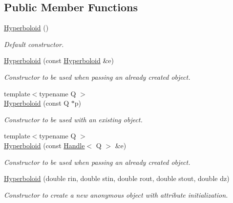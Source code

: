 \subsection*{Public Member Functions}
\begin{DoxyCompactItemize}
\item 
\hyperlink{class_d_d4hep_1_1_geometry_1_1_hyperboloid_afe9a3bdf73ffebe6f16ac8da3af563e7}{Hyperboloid} ()
\begin{DoxyCompactList}\small\item\em Default constructor. \item\end{DoxyCompactList}\item 
\hyperlink{class_d_d4hep_1_1_geometry_1_1_hyperboloid_a440775dc04e1e4b02254cce1867c7ee9}{Hyperboloid} (const \hyperlink{class_d_d4hep_1_1_geometry_1_1_hyperboloid}{Hyperboloid} \&e)
\begin{DoxyCompactList}\small\item\em Constructor to be used when passing an already created object. \item\end{DoxyCompactList}\item 
{\footnotesize template$<$typename Q $>$ }\\\hyperlink{class_d_d4hep_1_1_geometry_1_1_hyperboloid_ab4f5034fea85831e9fdda65dfcc717c7}{Hyperboloid} (const Q $\ast$p)
\begin{DoxyCompactList}\small\item\em Constructor to be used with an existing object. \item\end{DoxyCompactList}\item 
{\footnotesize template$<$typename Q $>$ }\\\hyperlink{class_d_d4hep_1_1_geometry_1_1_hyperboloid_a38aabbad56ee5c27ad2d67df74bac127}{Hyperboloid} (const \hyperlink{class_d_d4hep_1_1_handle}{Handle}$<$ Q $>$ \&e)
\begin{DoxyCompactList}\small\item\em Constructor to be used when passing an already created object. \item\end{DoxyCompactList}\item 
\hyperlink{class_d_d4hep_1_1_geometry_1_1_hyperboloid_a1ba636fc512e1c1c1c183a8ab24db52f}{Hyperboloid} (double rin, double stin, double rout, double stout, double dz)
\begin{DoxyCompactList}\small\item\em Constructor to create a new anonymous object with attribute initialization. \item\end{DoxyCompactList}\item 

\end{DoxyCompactItemize}
